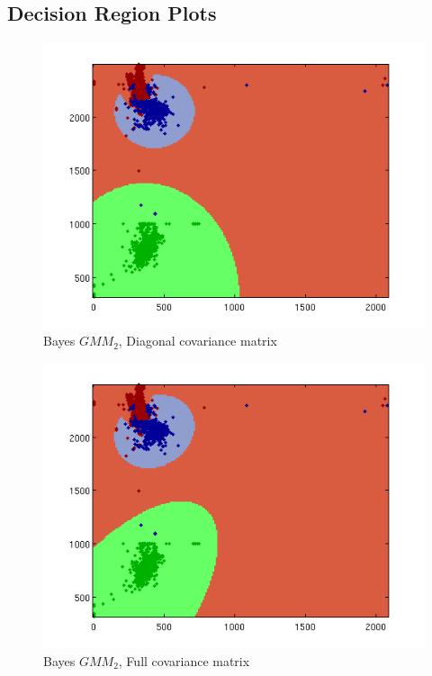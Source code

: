 \documentclass[a4paper]{article}
\begin{document}
\newpage
\subsection{Decision Region Plots}

\begin{figure}[htbp!]
\center
\includegraphics[clip, trim=40px 15px 30px 10px]{gmm_real_diagcov.png}
\caption{Bayes $GMM_{2}$, Diagonal covariance matrix}
\end{figure}

\begin{figure}[htbp!]
\center
\includegraphics[clip, trim=40px 15px 30px 10px]{gmm_real_fullcov.png}
\caption{Bayes $GMM_{2}$, Full covariance matrix}
\end{figure}
\end{document}
